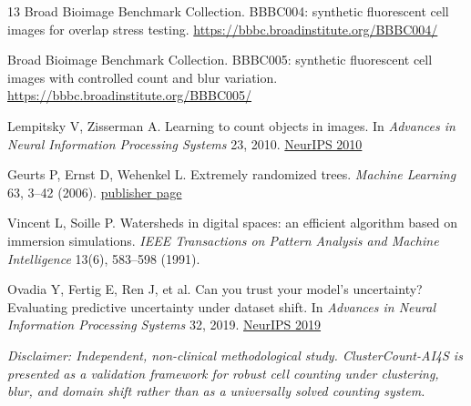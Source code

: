 \documentclass[10pt,a4paper,twocolumn]{article}
\begin{document}
\begin{thebibliography}{13}
Broad Bioimage Benchmark Collection.
\newblock BBBC004: synthetic fluorescent cell images for overlap stress testing.
\newblock \url{https://bbbc.broadinstitute.org/BBBC004/}

Broad Bioimage Benchmark Collection.
\newblock BBBC005: synthetic fluorescent cell images with controlled count and blur variation.
\newblock \url{https://bbbc.broadinstitute.org/BBBC005/}

Lempitsky V, Zisserman A.
\newblock Learning to count objects in images.
\newblock In \emph{Advances in Neural Information Processing Systems} 23, 2010.
\newblock \href{https://papers.nips.cc/paper/2010/hash/fe73f687e5bc5280214e0486b273a5f9-Abstract.html}{NeurIPS 2010}

Geurts P, Ernst D, Wehenkel L.
\newblock Extremely randomized trees.
\newblock \emph{Machine Learning} 63, 3--42 (2006).
\newblock \href{https://services.montefiore.uliege.be/stochastic/pubs/2006/GEW06a/}{publisher page}

Vincent L, Soille P.
\newblock Watersheds in digital spaces: an efficient algorithm based on immersion simulations.
\newblock \emph{IEEE Transactions on Pattern Analysis and Machine Intelligence} 13(6), 583--598 (1991).

Ovadia Y, Fertig E, Ren J, et al.
\newblock Can you trust your model's uncertainty? Evaluating predictive uncertainty under dataset shift.
\newblock In \emph{Advances in Neural Information Processing Systems} 32, 2019.
\newblock \href{https://papers.nips.cc/paper/9547-can-you-trust-your-models-uncertainty-evaluating-predictive-uncertainty-under-dataset-shift}{NeurIPS 2019}

\end{thebibliography}

\vspace{6pt}
\textit{Disclaimer: Independent, non-clinical methodological study. ClusterCount-AI4S is presented as a validation framework for robust cell counting under clustering, blur, and domain shift rather than as a universally solved counting system.}
\end{document}

